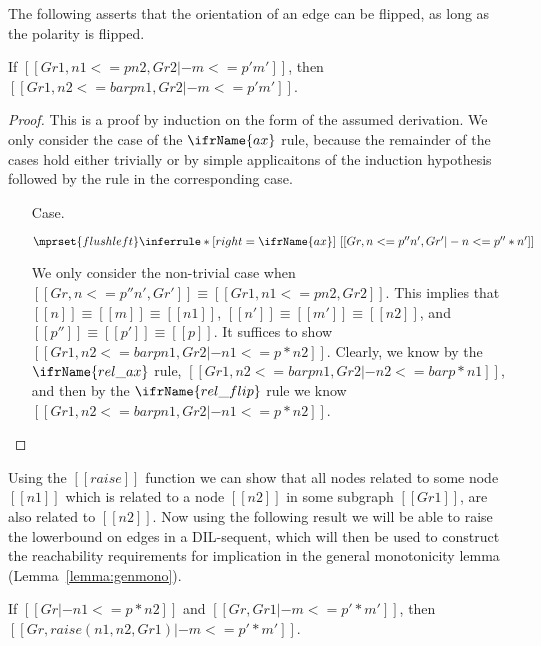 The following asserts that the orientation of an edge can be flipped,
as long as the polarity is flipped. 
\begin{lemma}[RelAssumFlip]
  \label{lemma:relassumflip}
  If $[[Gr1 , n1 <=p n2, Gr2 |- m <=p' m']]$, then $[[Gr1 , n2 <=bar p n1, Gr2 |- m <=p' m']]$.
\end{lemma}
  \begin{proof}
    This is a proof by induction on the form of the assumed
    derivation.  We only consider the case of the $\ifrName{ax}$ rule,
    because the remainder of the cases hold either trivially or by
    simple applicaitons of the induction hypothesis followed by the
    rule in the corresponding case.

    
    \begin{itemize}
    \item[Case.]\ \\ 
      \begin{center}
        \begin{math}
          $$\mprset{flushleft}
          \inferrule* [right=\ifrName{ax}] {
            \ 
          }{[[Gr , n <= p'' n' , Gr' |- n <= p'' * n']]}
        \end{math}
      \end{center}
      We only consider the non-trivial case when $[[Gr , n <= p'' n' , Gr']] \equiv [[Gr1 , n1 <=p n2, Gr2]]$.
      This implies that $[[n]] \equiv [[m]] \equiv [[n1]]$, $[[n']] \equiv [[m']] \equiv [[n2]]$, and 
      $[[p'']] \equiv [[p']] \equiv [[p]]$.  
      It suffices to show $[[Gr1 , n2 <=bar p n1, Gr2 |- n1 <= p * n2]]$.  Clearly, we know by the $\ifrName{rel\_ax}$
      rule, $[[Gr1 , n2 <=bar p n1, Gr2 |- n2 <=bar p * n1]]$, and then by the $\ifrName{rel\_flip}$ rule we know
      $[[Gr1 , n2 <=bar p n1, Gr2 |- n1 <=p * n2]]$.    
    \end{itemize}
  \end{proof}
Using the $[[raise]]$ function we can show that all nodes related to
some node $[[n1]]$ which is related to a node $[[n2]]$ in some
subgraph $[[Gr1]]$, are also related to $[[n2]]$.  Now using the
following result we will be able to raise the lowerbound on edges in
a DIL-sequent, which will then be used to construct the reachability
requirements for implication in the general monotonicity lemma
(Lemma~\ref{lemma:genmono}).
\begin{lemma}
  \label{lemma:raise_lower}
  If $[[Gr |- n1 <=p* n2]]$ and $[[Gr, Gr1 |- m <=p' * m']]$, then $[[Gr, raise(n1,n2,Gr1) |- m <=p' * m']]$.
\end{lemma}
